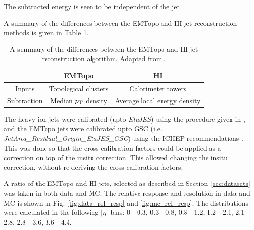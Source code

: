 The subtracted energy is seen to be independent of the jet\ \Et \ 



A summary of the differences between the EMTopo and HI jet reconstruction methods is given in Table \ref{table:algo_diff}.
\begin{table}[h]
\centering
\caption{A summary of the differences between the EMTopo and HI jet reconstruction algorithm. Adapted from \cite{HIjesnote}.}
\begin{tabular}{|c|c|c|}
\hline
            & EMTopo                 & HI                           \\ \hline
Inputs      & Topological clusters   & Calorimeter towers           \\ \hline
Subtraction & Median $\mbox{$p_{\mathrm{T}}$}$ density & Average local energy density \\ \hline
\end{tabular}
\label{table:algo_diff}
\end{table}




The heavy ion jets were calibrated (upto {\it EtaJES}) using the procedure given in \cite{HICalib}, and the EMTopo jets were calibrated upto GSC (i.e. {\it JetArea\_Residual\_Origin\_EtaJES\_GSC}) using the ICHEP recommendations \cite{CalibReco}. This was done so that the cross calibration factors could be applied as a correction on top of the insitu correction. This allowed changing the insitu correction, without re-deriving the cross-calibration factors. 

A ratio of the EMTopo and HI jets, selected as described in Section~\ref{sec:datasets} was taken in both data and MC. The relative response and resolution in data and MC is shown in Fig.~\ref{fig:data_rel_resp} and \ref{fig:mc_rel_resp}. The distributions were calculated in the following $|\eta|$ bins: 0 - 0.3, 0.3 - 0.8, 0.8 - 1.2, 1.2 - 2.1, 2.1 - 2.8, 2.8 - 3.6, 3.6 - 4.4.

